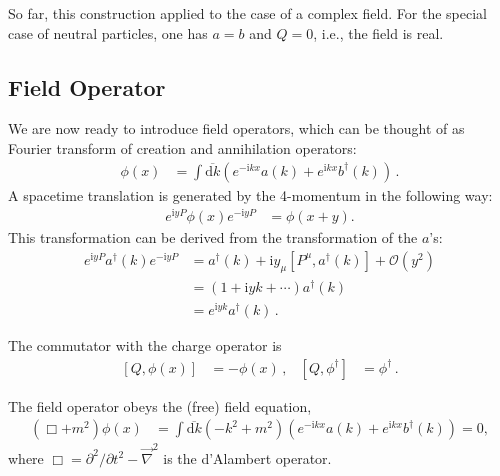 \documentclass[12pt]{report}
\renewcommand{\d}{\text{d}}
\newcommand{\dkbar}{\ensuremath{\overline{\d k}}}
\renewcommand{\i}{\ensuremath{\text{i}}}
\newcommand{\2}{\ensuremath{\sqrt{2}\,}}
\renewcommand{\d}{\ensuremath{\text{d}}}
\begin{document}
{      So far, this construction applied to the case of a complex field. For the special case of 
      neutral particles, one has $a=b$ and $Q=0$, i.e., the field is real. 


      \subsection{Field Operator}
      We are now ready to introduce field operators, which can be thought of as Fourier transform
      of creation and annihilation operators:
      \begin{align}\label{eq:fieldoperator}
        \phi (x)&= \int \dkbar \left( e^{-\i kx} a(k) + e^{\i kx} b^\dagger (k)\right)\,.
      \end{align}
      A spacetime translation is generated by the 4-momentum in the following way:
      \begin{align}
        e^{\i y P} \phi(x) e^{-\i y P}&= \phi (x+y).
      \end{align}
      This transformation can be derived from the transformation of the $a$'s:
      \begin{align}
        e^{\i y P} a^\dagger(k) e^{-\i y P} &= a^\dagger(k) +\i y_\mu \left[P^\mu,a^\dagger(k)\right] +
        \mathcal{O}\left(y^2\right) \\
        &= \left(1+ \i y k +\dotsm\right) a^\dagger(k)\\
        &= e^{\i y k} a^\dagger(k)\,.
      \end{align}

      The commutator with the charge operator is
      \begin{align}
        \left[Q,\phi(x)\right] &= -\phi(x)\,, & \left[Q,\phi^\dagger\right]&= \phi^\dagger\,.
      \end{align}

      The field operator obeys the (free) field equation,
      \begin{align}
        \left(\Box +m^2\right)\phi(x)&= \int \dkbar \left( -k^2 +m^2\right)\left(e^{-\i kx}a (k)
          +e^{\i kx} b^\dagger(k)\right)=0,
      \end{align}
      where $\Box = \partial^2/\partial t^2 - \vec{\nabla}^2$ is the d'Alambert operator.

\pagebreak

}
\end{document}
